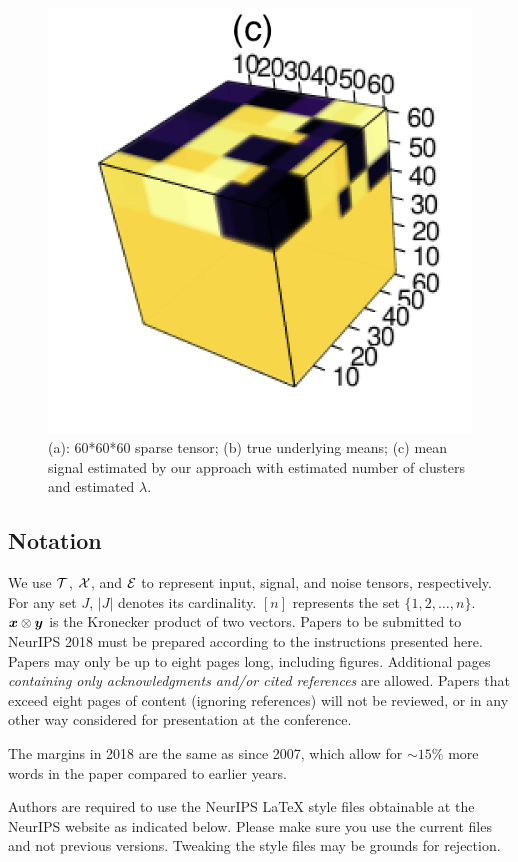 \documentclass{article}
\begin{document}
\begin{figure}
	\includegraphics[scale=0.5]{figures/figure2/output.png}
	\caption{(a): 60*60*60 sparse tensor; (b) true underlying means; (c) mean signal estimated by our approach with estimated number of clusters and estimated $\lambda$.}
	\label{fig2}
\end{figure}
\subsection{Notation}
We use $\mathcal{T}$, $\mathcal{X}$, and $\mathcal{E}$ to represent input, signal, and noise tensors, respectively. For any set $J$, $|J|$ denotes its cardinality. $[n]$ represents the set $\{1,2,\ldots,n\}$. $\bm x\otimes \bm{y}$ is the Kronecker product of two vectors. 
Papers to be submitted to NeurIPS 2018 must be prepared according to the
instructions presented here. Papers may only be up to eight pages long,
including figures. Additional pages \emph{containing only acknowledgments and/or
  cited references} are allowed. Papers that exceed eight pages of content
(ignoring references) will not be reviewed, or in any other way considered for
presentation at the conference.

The margins in 2018 are the same as since 2007, which allow for $\sim$$15\%$
more words in the paper compared to earlier years.

Authors are required to use the NeurIPS \LaTeX{} style files obtainable at the
NeurIPS website as indicated below. Please make sure you use the current files
and not previous versions. Tweaking the style files may be grounds for
rejection.
\end{document}
